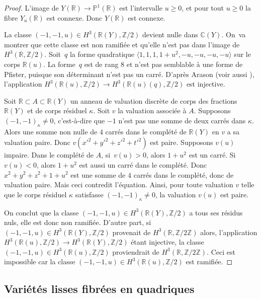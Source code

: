 \documentclass[11pt]{article}
\theoremstyle{definition}
\newcommand{\C}{\mathbb C}
\newcommand{\Z}{\mathbb Z}
\newcommand{\R}{\mathbb R}
\renewcommand{\P}{\mathbb P}
\begin{document}
\begin{proof}
L'image de $Y(\R) \to \P^1(\R)$ est l'intervalle $u\geq 0$, et pour tout $u\geq 0$ la fibre $Y_u(\R)$ est connexe. Donc $Y(\R)$ est connexe.

La classe $(-1,-1,u)\in H^3(\R(Y),\Z/2)$ devient nulle dans $\C(Y)$. On~va montrer que cette classe est non ramifiée et qu'elle n'est pas dans l'image de $H^3(\R,\Z/2)$. Soit~$q$ la forme quadratique
$\langle 1,1,1,1+u^2, -u,-u,-u,-u\rangle$ sur le corps $\R(u)$.
La forme~$q$ est de rang $8$ et n'est pas semblable à une forme de Pfister, puisque son déterminant
n'est pas un carré. D'après Arason \cite[Satz 5.6]{arason1975cohomologische} (voir aussi \cite[Cor.\,9.6.2]{kahn2008formes}), l'application $H^3(\R(u),\Z/2) \to H^3(\R(u)(q),\Z/2)$ est injective.

Soit $\R\subset A\subset \R(Y)$ un anneau de valuation discrète
de corps des fractions $\R(Y)$ et de corps résiduel $\kappa$.
Soit $v$ la valuation associée à $A$. Supposons
$(-1,-1)_{\kappa} \neq 0$, c'est-à-dire que $-1$ n'est pas une somme de
deux carrés dans $\kappa$. Alors une somme non nulle de $4$ carrés dans
le complété de $\R(Y)$ en $v$ a sa valuation paire.
Donc $v(x'^2+y'^2+z'^2+t'^2)$ est paire.
Supposons $v(u)$ impaire. Dans le complété de $A$,
si~$v(u)>0$, alors $1+u^2$ est un carré. Si $v(u)<0$, alors
$1+u^2$ est aussi un carré dans le complété. Donc
$x^2+y^2+z^2 + 1+u^2$ est une somme de $4$ carrés dans le complété,
donc de valuation paire. Mais ceci contredit l'équation.
Ainsi, pour toute valuation $v$ telle que le corps résiduel $\kappa$
satisfasse $(-1,-1)_{\kappa} \neq 0$, la valuation $v(u)$ est paire.

On conclut que la classe $(-1,-1,u) \in H^3(\R(Y),\Z/2)$ a tous ses résidus nuls,
elle est donc non ramifiée. D'autre part, si $(-1,-1,u) \in H^3(\R(Y),\Z/2)$ provenait de $H^3(\R,\Z/2\Z)$ alors, l'application $H^3(\R(u),\Z/2)\to H^3(\R(Y),\Z/2)$ étant injective, la classe $(-1,-1,u) \in H^3(\R(u),\Z/2)$ proviendrait de $H^3(\R,\Z/2\Z)$. Ceci est impossible car la classe $(-1,-1,u) \in H^3(\R(u),\Z/2)$ est ramifiée.
\end{proof}

\subsection{Variétés lisses fibrées en quadriques}
\end{document}
